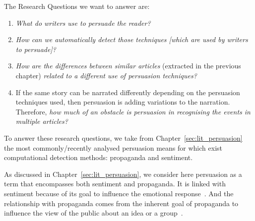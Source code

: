 The Research Questions we want to answer are: 
\begin{enumerate}
    \item \emph{What do writers use to persuade the reader?}
    \item \emph{How can we automatically detect those techniques [which are used by writers to persuade]?} %
    \item \emph{How are the differences between similar articles} (extracted in the previous chapter) \emph{related to a different use of persuasion techniques?} %
    \item If the same story can be narrated differently depending on the persuasion techniques used, then persuasion is adding variations to the narration. Therefore, \emph{how much of an obstacle is persuasion in recognising the events in multiple articles?} %
\end{enumerate}



To answer these research questions, we take from Chapter~\ref{sec:lit_persuasion} the most commonly/recently analysed \gls{persuasion} means for which exist computational detection methods: \gls{propaganda} and \gls{sentiment}.

As discussed in Chapter~\ref{sec:lit_persuasion}, we consider here \gls{persuasion} as a term that encompasses both \gls{sentiment} and \gls{propaganda}. %
It is linked with sentiment because of its goal to influence the emotional response~\citep{gatti2014sentiment,rocklage2018persuasion,petty2015emotion,desteno2004discrete}.
And the relationship with propaganda comes from the inherent goal of propaganda to influence the view of the public about an idea or a group~\citep{bernays,jowett2018propaganda}.


